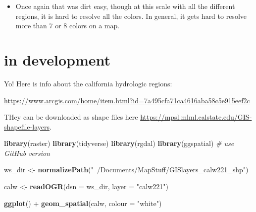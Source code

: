 \documentclass[]{book}
\newenvironment{Shaded}{\begin{snugshade}}{\end{snugshade}}
\newcommand{\KeywordTok}[1]{\textcolor[rgb]{0.13,0.29,0.53}{\textbf{{#1}}}}
\newcommand{\DataTypeTok}[1]{\textcolor[rgb]{0.13,0.29,0.53}{{#1}}}
\newcommand{\StringTok}[1]{\textcolor[rgb]{0.31,0.60,0.02}{{#1}}}
\newcommand{\CommentTok}[1]{\textcolor[rgb]{0.56,0.35,0.01}{\textit{{#1}}}}
\newcommand{\NormalTok}[1]{{#1}}
\providecommand{\tightlist}{%
  \setlength{\itemsep}{0pt}\setlength{\parskip}{0pt}}
\theoremstyle{definition}
\theoremstyle{definition}
\theoremstyle{remark}
\begin{document}
\begin{itemize}
\tightlist
\item
  Once again that was dirt easy, though at this scale with all the
  different regions, it is hard to resolve all the colors. In general,
  it gets hard to resolve more than 7 or 8 colors on a map.
\end{itemize}

\chapter{in development}\label{in-development}

Yo! Here is info about the california hydrologic regions:

\url{https://www.arcgis.com/home/item.html?id=7a495cfa71ca4616aba58c5e915eef2c}

THey can be downloaded as shape files here
\url{https://mpsl.mlml.calstate.edu/GIS-shapefile-layers}.

\begin{Shaded}
\begin{Highlighting}[]
\KeywordTok{library}\NormalTok{(raster)}
\KeywordTok{library}\NormalTok{(tidyverse)}
\KeywordTok{library}\NormalTok{(rgdal)}
\KeywordTok{library}\NormalTok{(ggspatial)  }\CommentTok{# use GitHub version}


\NormalTok{ws_dir <-}\StringTok{ }\KeywordTok{normalizePath}\NormalTok{(}\StringTok{"~/Documents/MapStuff/GISlayers_calw221_shp"}\NormalTok{)}

\NormalTok{calw <-}\StringTok{ }\KeywordTok{readOGR}\NormalTok{(}\DataTypeTok{dsn =} \NormalTok{ws_dir, }
        \DataTypeTok{layer =} \StringTok{"calw221"}\NormalTok{)}

\KeywordTok{ggplot}\NormalTok{() +}
\StringTok{  }\KeywordTok{geom_spatial}\NormalTok{(calw, }\DataTypeTok{colour =} \StringTok{"white"}\NormalTok{)}
\end{Highlighting}
\end{Shaded}


\end{document}
